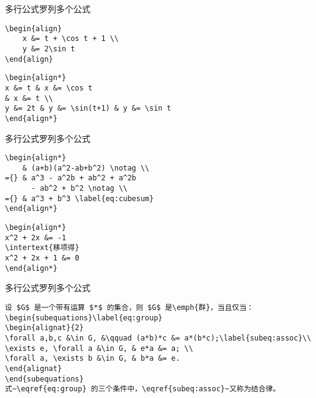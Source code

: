 \documentclass[11pt]{beamer}
\begin{document}
\begin{frame}[fragile]{多行公式}{罗列多个公式}
\begin{lstlisting}
\begin{align}
	x &= t + \cos t + 1 \\
	y &= 2\sin t
\end{align}
\end{lstlisting}
\begin{lstlisting}
\begin{align*}
x &= t & x &= \cos t
& x &= t \\
y &= 2t & y &= \sin(t+1) & y &= \sin t
\end{align*}
\end{lstlisting}
\end{frame}

\begin{frame}[fragile]{多行公式}{罗列多个公式}
\begin{lstlisting}
\begin{align*}
	& (a+b)(a^2-ab+b^2) \notag \\
={}	& a^3 - a^2b + ab^2 + a^2b
	  - ab^2 + b^2 \notag \\
={}	& a^3 + b^3 \label{eq:cubesum}
\end{align*}
\end{lstlisting}
\begin{lstlisting}
\begin{align*}
x^2 + 2x &= -1
\intertext{移项得}
x^2 + 2x + 1 &= 0
\end{align*}
\end{lstlisting}
\end{frame}

\begin{frame}[fragile]{多行公式}{罗列多个公式}
\begin{lstlisting}
设 $G$ 是一个带有运算 $*$ 的集合，则 $G$ 是\emph{群}，当且仅当：
\begin{subequations}\label{eq:group}
\begin{alignat}{2}
\forall a,b,c &\in G, &\qquad (a*b)*c &= a*(b*c);\label{subeq:assoc}\\
\exists e, \forall a &\in G, & e*a &= a; \\
\forall a, \exists b &\in G, & b*a &= e.
\end{alignat}
\end{subequations}
式~\eqref{eq:group} 的三个条件中，\eqref{subeq:assoc}~又称为结合律。
\end{lstlisting}
\end{frame}
\end{document}
